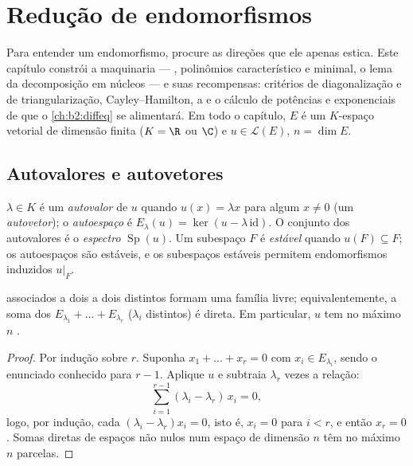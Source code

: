 \chapter{Redução de endomorfismos}\label{ch:b2:reduction}

Para entender um endomorfismo, procure as direções que ele apenas
estica. Este capítulo constrói a maquinaria --- ,
polinômios característico e minimal, o lema da decomposição
em núcleos --- e suas recompensas: critérios de diagonalização e de
triangularização, Cayley--Hamilton, a  e o
cálculo de potências e exponenciais de que o
\cref{ch:b2:diffeq} se alimentará. Em todo o capítulo, $E$ é um
$K$-espaço vetorial de dimensão finita ($K = \R$ ou $\C$) e $u \in
\mathcal{L}(E)$, $n = \dim E$.

\section{Autovalores e autovetores}

\begin{definition}\label{def:b2:reduction:eigen}
$\lambda \in K$ é um \emph{autovalor} de $u$
quando $u(x) = \lambda x$ para algum $x \neq 0$ (um
\emph{autovetor}); o \emph{autoespaço} é $E_\lambda(u) =
\ker(u - \lambda\,\mathrm{id})$. O conjunto dos autovalores é o
\emph{espectro} $\operatorname{Sp}(u)$. Um subespaço $F$ é
\emph{estável} quando $u(F) \subseteq F$; os autoespaços são estáveis, e os
subespaços estáveis permitem endomorfismos induzidos $u|_F$.
\end{definition}

\begin{theorem}\label{thm:b2:reduction:independence}
 associados a  dois a dois distintos formam uma
família livre; equivalentemente, a soma dos 
$E_{\lambda_1} + \dots + E_{\lambda_r}$ ($\lambda_i$ distintos) é
direta. Em particular, $u$ tem no máximo $n$ .
\end{theorem}

\begin{proof}
Por indução sobre $r$. Suponha $x_1 + \dots + x_r = 0$ com $x_i \in
E_{\lambda_i}$, sendo o enunciado conhecido para $r - 1$. Aplique $u$ e
subtraia $\lambda_r$ vezes a relação:
\[
\sum_{i=1}^{r-1} (\lambda_i - \lambda_r)\, x_i = 0 ,
\]
logo, por indução, cada $(\lambda_i - \lambda_r)x_i = 0$, isto é, $x_i =
0$ para $i < r$, e então $x_r = 0$. Somas diretas de espaços não nulos num
espaço de dimensão $n$ têm no máximo $n$ parcelas.
\end{proof}


